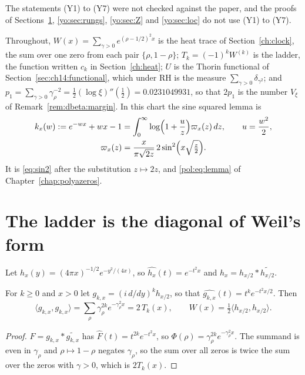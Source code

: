 The statements (Y1) to (Y7) were not checked against the paper, and the proofs of Sections~\ref{yo:sec:diag}, \ref{yo:sec:rungs}, \ref{yo:sec:Z} and \ref{yo:sec:loc} do not use (Y1) to (Y7).

Throughout, $W(x)=\sum_{\gamma>0}e^{(\rho-1/2)^2x}$ is the heat trace of Section~\ref{ch:clock}, the sum over one zero from each pair $\{\rho,1-\rho\}$; $T_k=(-1)^kW^{(k)}$ is the ladder, the function written $c_k$ in Section~\ref{ch:heat}; $U$ is the Thorin functional of Section~\ref{sec:ch14:functional}, which under RH is the measure $\sum_{\gamma>0}\delta_{\gamma^2}$; and $p_1=\sum_{\gamma>0}\gamma_\rho^{-2}=\frac12(\log\xi)''(\frac12)=0.0231049931$, so that $2p_1$ is the number $V_\xi$ of Remark~\ref{rem:dbeta:margin}. In this chart the sine squared lemma is
\begin{equation}\label{yo:lemma}
\begin{gathered}
k_x(w):=e^{-wx}+wx-1=\int_0^\infty\log\Bigl(1+\frac uz\Bigr)\varpi_x(z)\,dz,\qquad u=\frac{w^2}2,\\
\varpi_x(z)=\frac{x}{\pi\sqrt{2z}}\,2\sin^2\Bigl(x\sqrt{\tfrac z2}\Bigr).
\end{gathered}
\end{equation}
It is \eqref{eq:sin2} after the substitution $z\mapsto2z$, and \eqref{pol:eq:lemma} of Chapter~\ref{chap:polyazeros}.

\section{The ladder is the diagonal of Weil's form}\label{yo:sec:diag}

Let $h_x(y)=(4\pi x)^{-1/2}e^{-y^2/(4x)}$, so $\widehat{h_x}(t)=e^{-t^2x}$ and $h_x=h_{x/2}*\widetilde{h_{x/2}}$.

\begin{proposition}\label{yo:prop:diag}
For $k\ge0$ and $x>0$ let $g_{k,x}=(i\,d/dy)^kh_{x/2}$, so that $\widehat{g_{k,x}}(t)=t^ke^{-t^2x/2}$. Then
\[
\langle g_{k,x},g_{k,x}\rangle=\sum_\rho\gamma_\rho^{2k}e^{-\gamma_\rho^2x}=2\,T_k(x),\qquad W(x)=\tfrac12\langle h_{x/2},h_{x/2}\rangle .
\]
\end{proposition}

\begin{proof}
$F=g_{k,x}*\widetilde{g_{k,x}}$ has $\widehat F(t)=t^{2k}e^{-t^2x}$, so $\Phi(\rho)=\gamma_\rho^{2k}e^{-\gamma_\rho^2x}$. The summand is even in $\gamma_\rho$ and $\rho\mapsto1-\rho$ negates $\gamma_\rho$, so the sum over all zeros is twice the sum over the zeros with $\gamma>0$, which is $2T_k(x)$.
\end{proof}

